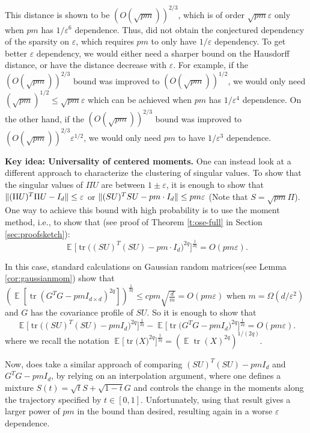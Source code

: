 \documentclass[11pt]{amsart}
\numberwithin{equation}{section}
\numberwithin{equation}{section}
\DeclareMathOperator{\E}{\mathbb{E}}
\DeclareMathOperator*{\tr}{tr}
\DeclarePairedDelimiter{\norm}{\lVert}{\rVert}
\theoremstyle{remark}
\theoremstyle{definition}
\begin{document}
This distance is shown to be $(O(\sqrt{pm}))^{2/3}$, which is of order $\sqrt{pm}\varepsilon$ only when $pm$ has $1/\varepsilon^6$ dependence. Thus, \cite{chenakkod2024optimal} did not obtain the conjectured dependency of the sparsity on $\varepsilon$, which requires $pm$ to only have $1/\varepsilon$ dependency. To get better $\varepsilon$ dependency, we would either need a sharper bound on the Hausdorff distance, or have the distance decrease with $\varepsilon$. For example, if the $(O(\sqrt{pm}))^{2/3}$ bound was improved to $(O(\sqrt{pm}))^{1/2}$, we would only need $(\sqrt{pm})^{1/2} \le \sqrt{pm} \varepsilon$ which can be achieved when $pm$ has $1/\varepsilon^4 $ dependence. On the other hand, if the $(O(\sqrt{pm}))^{2/3}$ bound was improved to $(O(\sqrt{pm}))^{2/3} \varepsilon^{1/2}$, we would only need $pm$ to have $1/\varepsilon^3$ dependence. 


\textbf{Key idea: Universality of centered moments.}
One can instead look at a different approach to characterize the clustering of singular values. To show that the singular values of $\Pi U$ are between $1 \pm \varepsilon$, it is enough to show that $\norm{(\Pi U)^T\Pi U - I_d} \le \varepsilon$ or $\norm{(S U)^TSU - pm\cdot I_d} \le pm \varepsilon$ (Note that $S=\sqrt{pm} \Pi$). One way to achieve this bound with high probability is to use the moment method, i.e., to show that (see proof of Theorem \ref{t:ose-full} in Section \ref{sec:proofsketch}):
$$\E\Big[\tr \big((SU)^T(SU) - pm \cdot I_{d}\big)^{2q}\Big]^{\frac{1}{2q}}=O(pm \varepsilon).$$  

In this case, standard calculations on Gaussian random matrices(see Lemma \ref{cor:gaussianmom}) show that $(\E[\tr (G^TG - pmI_{d \times d})^{2q}])^{\frac{1}{2q}} \le cpm\sqrt{\frac{d}{m}}=O(pm \varepsilon)$ when $m = \Omega(d/\varepsilon^2)$ and $G$ has the covariance profile of $SU$. So it is enough to show that 
$$\E\Big[\tr \big((SU)^T(SU) - pmI_{d}\big)^{2q}\Big]^{\frac{1}{2q}}-\E\Big[\tr \big(G^TG - pmI_{d}\big)^{2q}\Big]^{\frac{1}{2q}}=O(pm\varepsilon).$$
where we recall the notation $\E\Big[\tr \big(X\big)^{2q}\Big]^{\frac{1}{2q}}=\left (\E\tr\left ( X \right )^{2q}\right )^{1/(2q)}
$.

Now, \cite[Proposition 9.12]{brailovskaya2022universality} does take a similar approach of comparing $(SU)^T(SU) - pmI_{d}$ and $G^TG - pmI_{d}$, by relying on an interpolation argument, where one defines a mixture $S(t) = \sqrt{t} S+\sqrt{1-t}G$ and controls the change in the moments along the trajectory specified by $t\in[0,1]$.  Unfortunately, using that result gives a larger power of $pm$ in the bound than desired, resulting again in a worse $\varepsilon$ dependence.
\end{document}
